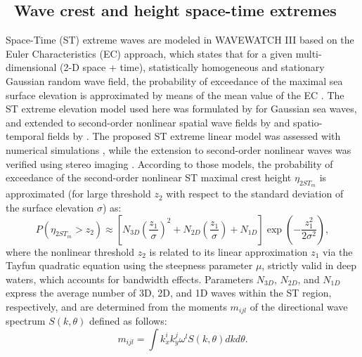 \vssub
\subsection{~Wave crest and height space-time extremes} \label{sub:space_time_ext}

Space-Time (ST) extreme waves are modeled in WAVEWATCH III based on the Euler Characteristics (EC) approach, which states that for a given multi-dimensional (2-D space + time), statistically homogeneous and stationary Gaussian random wave field, the probability of exceedance of the maximal sea surface elevation is approximated by means of the mean value of the EC \citep{Fed12eu}. The ST extreme elevation model used here was formulated by \cite{Fed12sp} for Gaussian sea waves, and extended to second-order nonlinear spatial wave fields by \cite{Fed13} and spatio-temporal fields by \cite{Beet15}. The proposed ST extreme linear model was assessed with numerical simulations \citep{Baet15,Baet16}, while the extension to second-order nonlinear waves was verified using stereo imaging \citep{Fed13,Beet15}. According to those models, the probability of exceedance of the second-order nonlinear ST maximal crest height $\eta_{2ST_m}$ is approximated (for large threshold $z_2$ with respect to the standard deviation of the surface elevation $\sigma$) as:
\begin{equation}
P(\eta_{2ST_m} > z_2) \approx \left[N_{3D} \left( \frac{z_1}{\sigma} \right)^{2} + N_{2D} \left( \frac{z_1}{\sigma} \right) + N_{1D} \right] \exp{ \left( -\frac{z_1^2}{2 \sigma^2} \right)},
\label{eq_STE1}
\end{equation}
where the nonlinear threshold $z_2$ is related to its linear approximation $z_1$ via the Tayfun quadratic equation using the steepness parameter $\mu$, strictly valid in deep waters, which accounts for bandwidth effects. Parameters $N_{3D}$, $N_{2D}$, and $N_{1D}$ express the average number of 3D, 2D, and 1D waves within the ST region, respectively, and are determined from the moments $m_{ijl}$ of the directional wave spectrum $S(k, \theta)$ defined as follows:
\begin{equation}
m_{ijl}=\int k_{x}^{i}k_{y}^{j}\omega^{l}S(k,\theta)dkd\theta.
\label{eq_STE2}
\end{equation}

